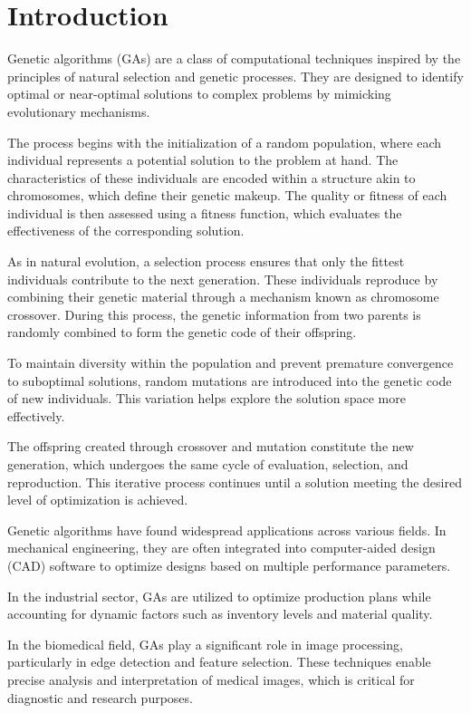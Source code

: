 \section{Introduction}

Genetic algorithms (GAs) are a class of computational techniques inspired by 
the principles of natural selection and genetic processes. 
They are designed to identify optimal or near-optimal solutions to
complex problems by mimicking evolutionary mechanisms.

The process begins with the initialization of a random population,
where each individual represents a potential solution to the problem at hand. 
The characteristics of these individuals are encoded within a structure akin to chromosomes, 
which define their genetic makeup. The quality or fitness of each individual is then assessed using 
a fitness function, which evaluates the effectiveness of the corresponding solution.

As in natural evolution, a selection process ensures that only the fittest individuals
contribute to the next generation. These individuals reproduce by combining their genetic material 
through a mechanism known as chromosome crossover. During this process, 
the genetic information from two parents is randomly combined to form the genetic code of their 
offspring.

To maintain diversity within the population and prevent premature convergence to suboptimal solutions,
random mutations are introduced into the genetic code of new individuals.
This variation helps explore the solution space more effectively.

The offspring created through crossover and mutation constitute the new generation, 
which undergoes the same cycle of evaluation, selection, and reproduction.
This iterative process continues until a solution meeting the desired level of optimization is achieved.

Genetic algorithms have found widespread applications across various fields. In mechanical engineering,
they are often integrated into computer-aided design (CAD) software to optimize designs based on multiple
performance parameters. 

In the industrial sector, GAs are utilized to optimize production plans while accounting for dynamic
 factors such as inventory levels and material quality. 

In the biomedical field, GAs play a significant role in image processing, particularly
 in edge detection and feature selection. These techniques enable precise analysis and interpretation of 
 medical images, which is critical for diagnostic and research purposes.
